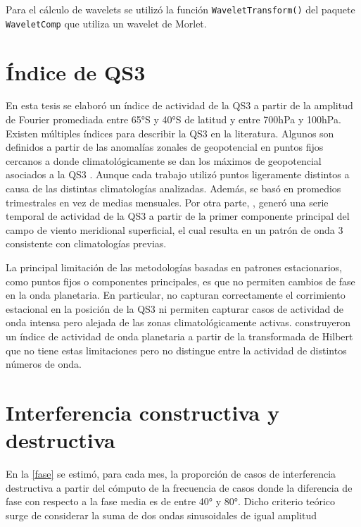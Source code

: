 \documentclass[spanish,a4paper,12pt,oneside]{book}
\begin{document}
Para el cálculo de wavelets se utilizó la función
\texttt{WaveletTransform()} del paquete \texttt{WaveletComp}
\citep{R-WaveletComp} que utiliza un wavelet de Morlet.

\section*{Índice de QS3}

En esta tesis se elaboró un índice de actividad de la QS3 a partir de la
amplitud de Fourier promediada entre 65°S y 40°S de latitud y entre
700hPa y 100hPa. Existen múltiples índices para describir la QS3 en la
literatura. Algunos son definidos a partir de las anomalías zonales de
geopotencial en puntos fijos cercanos a donde climatológicamente se dan
los máximos de geopotencial asociados a la QS3
\citep[ej.][\citet{Cai1999} y \citet{Raphael2004}]{Mo1985}. Aunque cada
trabajo utilizó puntos ligeramente distintos a causa de las distintas
climatologías analizadas. Además, \citet{Raphael2004} se basó en
promedios trimestrales en vez de medias mensuales. Por otra parte,
\citet{Yuan2008}, generó una serie temporal de actividad de la QS3 a
partir de la primer componente principal del campo de viento meridional
superficial, el cual resulta en un patrón de onda 3 consistente con
climatologías previas.

La principal limitación de las metodologías basadas en patrones
estacionarios, como puntos fijos o componentes principales, es que no
permiten cambios de fase en la onda planetaria. En particular, no
capturan correctamente el corrimiento estacional en la posición de la
QS3 \citep{Loon1972} ni permiten capturar casos de actividad de onda
intensa pero alejada de las zonas climatológicamente activas.
\citet{Irving2015} construyeron un índice de actividad de onda
planetaria a partir de la transformada de Hilbert que no tiene estas
limitaciones pero no distingue entre la actividad de distintos números
de onda.

\section*{Interferencia constructiva y destructiva}

En la \autoref{fase} se estimó, para cada mes, la proporción de casos de
interferencia destructiva a partir del cómputo de la frecuencia de casos
donde la diferencia de fase con respecto a la fase media es de entre 40°
y 80°. Dicho criterio teórico surge de considerar la suma de dos ondas
sinusoidales de igual amplitud
\end{document}
